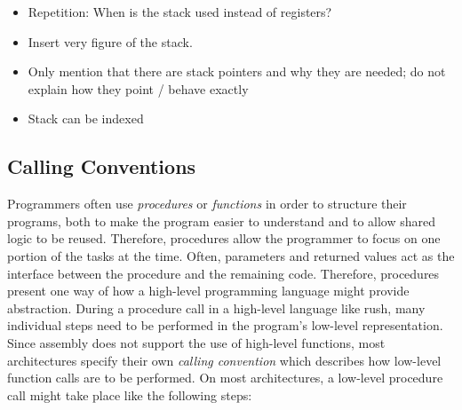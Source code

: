 \begin{itemize}
	\item Repetition: When is the stack used instead of registers?
	\item Insert very figure of the stack.
    \item Only mention that there are stack pointers and why they are needed; do not explain how they point / behave exactly
    \item Stack can be indexed
\end{itemize}

\subsection{Calling Conventions}

Programmers often use \emph{procedures} or \emph{functions} in order to structure their programs,
both to make the program easier to understand and to allow shared logic to be reused.
Therefore, procedures allow the programmer to focus on one portion of the tasks at the time.
Often, parameters and returned values act as the interface between the procedure and the remaining code.
Therefore, procedures present one way of how a high-level programming language might provide abstraction.
During a procedure call in a high-level language like rush, many individual steps need to be performed in the program's low-level representation.
Since assembly does not support the use of high-level functions, most architectures specify their own \emph{calling convention} which describes how low-level function calls are to be performed.
On most architectures, a low-level procedure call might take place like the following steps:

